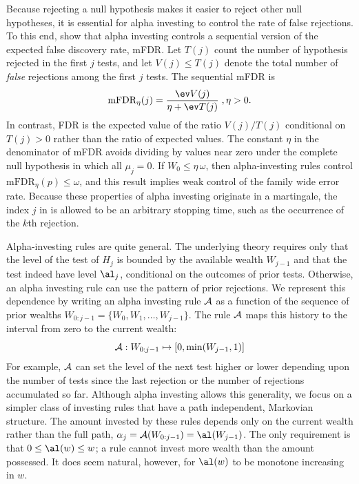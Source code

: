 \documentclass[12pt]{article}
\begin{document}
 Because rejecting a null hypothesis makes it easier to reject other null
 hypotheses, it is essential for alpha investing to control the rate of false
 rejections.  To this end, \citet{fosterstine08} show that alpha investing
 controls a sequential version of the expected false discovery rate, mFDR.  Let
 $T(j)$ count the number of hypothesis rejected in the first $j$ tests, and let
 $V(j) \le T(j)$ denote the total number of {\em false} rejections among the
 first $j$ tests.  The sequential mFDR is
 \begin{equation}
    \mbox{mFDR}_\eta(j) = \frac{\ev V(j)}{\eta + \ev T(j)} \;, \eta > 0.
 \label{eq:mFDR}
 \end{equation}
 In contrast, FDR is the expected value of the ratio $V(j)/T(j)$ conditional on
 $T(j)>0$ rather than the ratio of expected values.  The constant $\eta$ in the
 denominator of mFDR avoids dividing by values near zero under the complete null
 hypothesis in which all $\mu_j = 0$.  If $W_0 \le \eta\,\omega$, then
 alpha-investing rules control $\mbox{mFDR}_\eta(p) \le \omega$, and this result
 implies weak control of the family wide error rate.  Because these properties
 of alpha investing originate in a martingale, the index $j$ in  is
 allowed to be an arbitrary stopping time, such as the occurrence of the $k$th
 rejection.

 
 Alpha-investing rules are quite general.  The underlying theory requires only
 that the level of the test of $H_j$ is bounded by the available wealth
 $W_{j-1}$ and that the test indeed have level $\al_j$, conditional on the
 outcomes of prior tests.  Otherwise, an alpha investing rule can use the
 pattern of prior rejections.  We represent
 this dependence by writing an alpha investing rule ${\cal A}$ as a function of the
 sequence of prior wealths $W_{0:j-1} = \{W_0, W_1, \ldots, W_{j-1}\}$.  The rule
 $\cal A$ maps this history to the interval from zero to the current wealth:
 \begin{equation}
    {\cal A}: W_{0:j-1} \mapsto [0, \min(W_{j-1},1)]    
 \label{eq:A}
 \end{equation}
 For example, $\cal A$ can set the level of the next test higher or lower
 depending upon the number of tests since the last rejection or the number of
 rejections accumulated so far.  Although alpha investing allows this
 generality, we focus on a simpler class of investing rules that have a path
 independent, Markovian structure.  The amount invested by these rules depends
 only on the current wealth rather than the full path, $\alpha_j = {\cal
 A}(W_{0:j-1}) = \al(W_{j-1})$.  The only requirement is that $0 \le \al(w) \le w$; a
 rule cannot invest more wealth than the amount possessed.  It does seem
 natural, however, for $\al(w)$ to be monotone increasing in $w$.
\end{document}
